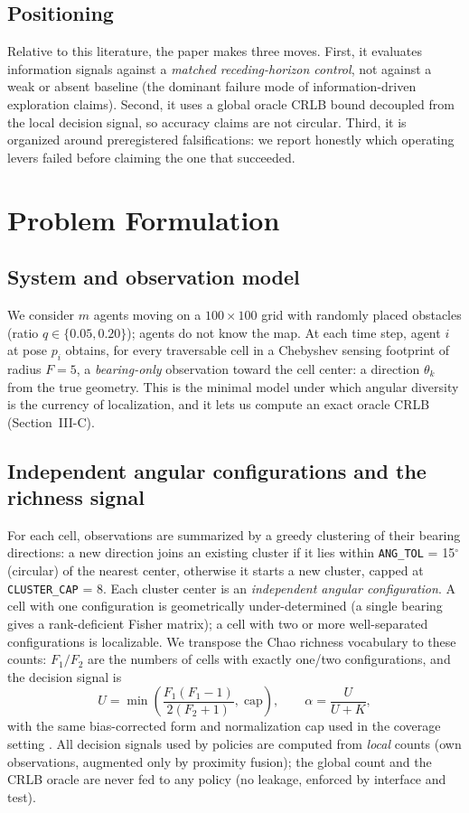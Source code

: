 \documentclass[journal]{IEEEtran}
\begin{document}
\subsection{Positioning}
Relative to this literature, the paper makes three moves. First, it evaluates
information signals against a \emph{matched receding-horizon control}, not
against a weak or absent baseline (the dominant failure mode of
information-driven exploration claims). Second, it uses a global oracle CRLB
bound decoupled from the local decision signal, so accuracy claims are not
circular. Third, it is organized around preregistered falsifications: we
report honestly which operating levers failed before claiming the one that
succeeded.


\section{Problem Formulation}
\subsection{System and observation model}
We consider $m$ agents moving on a $100 \times 100$ grid with randomly placed
obstacles (ratio $q \in \{0.05, 0.20\}$); agents do not know the map. At each
time step, agent $i$ at pose $p_i$ obtains, for every traversable cell in a
Chebyshev sensing footprint of radius $F = 5$, a \emph{bearing-only}
observation toward the cell center: a direction $\theta_k$ from the true
geometry. This is the minimal model under which angular diversity is the
currency of localization, and it lets us compute an exact oracle CRLB
(Section~III-C).

\subsection{Independent angular configurations and the richness signal}
For each cell, observations are summarized by a greedy clustering of their
bearing directions: a new direction joins an existing cluster if it lies
within \texttt{ANG\_TOL} = 15$^\circ$ (circular) of the nearest center,
otherwise it starts a new cluster, capped at \texttt{CLUSTER\_CAP} = 8. Each
cluster center is an \emph{independent angular configuration}. A cell with one
configuration is geometrically under-determined (a single bearing gives a
rank-deficient Fisher matrix); a cell with two or more well-separated
configurations is localizable. We transpose the Chao richness vocabulary to
these counts: $F_1/F_2$ are the numbers of cells with exactly one/two
configurations, and the decision signal is
\begin{equation}
U = \min\!\left( \frac{F_1 (F_1 - 1)}{2 (F_2 + 1)},\; \text{cap} \right),
\qquad \alpha = \frac{U}{U + K},
\end{equation}
with the same bias-corrected form and normalization cap used in the coverage
setting \cite{Chao1984}. All decision signals used by policies are computed
from \emph{local} counts (own observations, augmented only by proximity
fusion); the global count and the CRLB oracle are never fed to any policy (no
leakage, enforced by interface and test).
\end{document}
